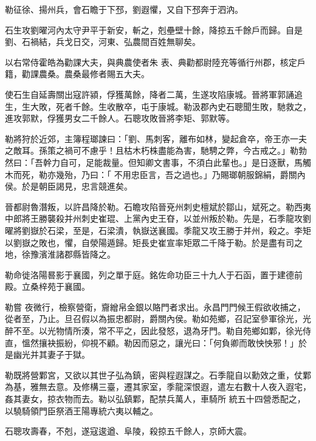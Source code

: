 \begin{pinyinscope}
 勒征徐、揚州兵，會石瞻于下邳，劉遐懼，又自下邳奔于泗汭。



 石生攻劉曜河內太守尹平于新安，斬之，剋壘壁十餘，降掠五千餘戶而歸。自是劉、石禍結，兵戈日交，河東、弘農間百姓無聊矣。



 以右常侍霍皓為勸課大夫，與典農使者朱
 表、典勸都尉陸充等循行州郡，核定戶籍，勸課農桑。農桑最修者賜五大夫。



 使石生自延壽關出寇許潁，俘獲萬餘，降者二萬，生遂攻陷康城。晉將軍郭誦追生，生大敗，死者千餘。生收散卒，屯于康城。勒汲郡內史石聰聞生敗，馳救之，進攻郭默，俘獲男女二千餘人。石聰攻敗晉將李矩、郭默等。



 勒將狩於近郊，主簿程瑯諫曰：「劉、馬刺客，離布如林，變起倉卒，帝王亦一夫之敵耳。孫策之禍可不慮乎！且枯木朽株盡能為害，馳騁之弊，今古戒之。」勒勃然曰：「吾幹力自可，足能裁量。但知卿文書事，不須白此輩也。」是日逐獸，馬觸木而死，勒亦幾殆，乃曰：「
 不用忠臣言，吾之過也。」乃賜瑯朝服錦絹，爵關內侯。於是朝臣謁見，忠言競進矣。



 晉都尉魯潛叛，以許昌降於勒。石瞻攻陷晉兗州刺史檀斌於鄒山，斌死之。勒西夷中郎將王勝襲殺并州刺史崔琨、上黨內史王昚，以並州叛於勒。先是，石季龍攻劉曜將劉嶽於石梁，至是，石梁潰，執嶽送襄國。季龍又攻王勝于并州，殺之。李矩以劉嶽之敗也，懼，自滎陽遁歸。矩長史崔宣率矩眾二千降于勒。於是盡有司之地，徐豫濱淮諸郡縣皆降之。



 勒命徙洛陽晷影于襄國，列之單于庭。銘佐命功臣三十九人于石函，置于建德前殿。立桑梓苑于襄國。



 勒嘗
 夜微行，檢察營衛，齎繒帛金銀以賂門者求出。永昌門門候王假欲收捕之，從者至，乃止。旦召假以為振忠都尉，爵關內侯。勒如苑鄉，召記室參軍徐光，光醉不至。以光物情所湊，常不平之，因此發怒，退為牙門。勒自苑鄉如鄴，徐光侍直，慍然攘袂振紛，仰視不顧。勒因而惡之，讓光曰：「何負卿而敢怏怏邪！」於是幽光并其妻子于獄。



 勒既將營鄴宮，又欲以其世子弘為鎮，密與程遐謀之。石季龍自以勳效之重，仗鄴為基，雅無去意。及修構三臺，遷其家室，季龍深恨遐，遣左右數十人夜入遐宅，姦其妻女，掠衣物而去。勒以弘鎮鄴，配禁兵萬人，車騎所
 統五十四營悉配之，以驍騎領門臣祭酒王陽專統六夷以輔之。



 石聰攻壽春，不剋，遂寇逡遒、阜陵，殺掠五千餘人，京師大震。




\end{pinyinscope}
